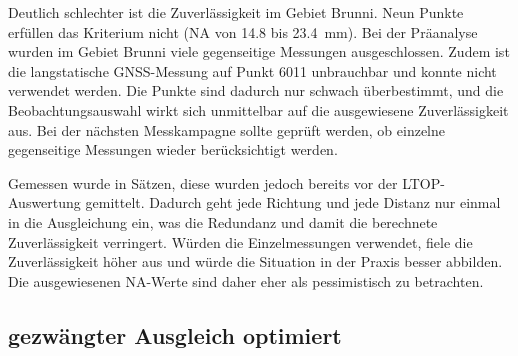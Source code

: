 Deutlich schlechter ist die Zuverlässigkeit im Gebiet Brunni. Neun Punkte erfüllen das Kriterium
nicht (NA von 14.8 bis 23.4~mm).
Bei der Präanalyse wurden im Gebiet Brunni viele gegenseitige Messungen ausgeschlossen. Zudem ist
die langstatische GNSS-Messung auf Punkt 6011 unbrauchbar und konnte nicht verwendet werden. Die
Punkte sind dadurch nur schwach überbestimmt, und die Beobachtungsauswahl wirkt sich unmittelbar
auf die ausgewiesene Zuverlässigkeit aus. Bei der nächsten Messkampagne sollte geprüft werden, ob
einzelne gegenseitige Messungen wieder berücksichtigt werden. \bigskip

Gemessen wurde in Sätzen, diese wurden jedoch bereits vor der LTOP-Auswertung gemittelt. Dadurch
geht jede Richtung und jede Distanz nur einmal in die Ausgleichung ein, was die Redundanz und
damit die berechnete Zuverlässigkeit verringert. Würden die Einzelmessungen verwendet, fiele die
Zuverlässigkeit höher aus und würde die Situation in der Praxis besser abbilden. Die
ausgewiesenen NA-Werte sind daher eher als pessimistisch zu betrachten.



\subsection{gezwängter Ausgleich optimiert}

